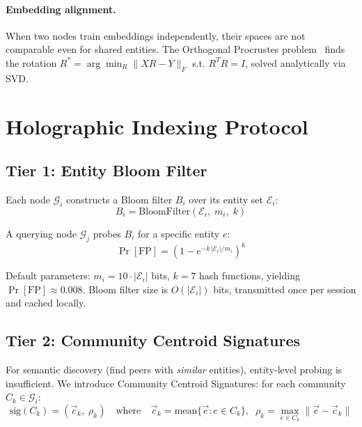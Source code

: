 \documentclass[10pt,twocolumn]{article}
\begin{document}
\paragraph{Embedding alignment.}
When two nodes train embeddings independently, their spaces are not comparable even for
shared entities. The Orthogonal Procrustes problem~\cite{schonemann1966procrustes} finds the
rotation $R^* = \arg\min_R \|XR - Y\|_F$ s.t. $R^TR = I$, solved analytically via SVD.

\section{Holographic Indexing Protocol}
\label{sec:protocol}

\subsection{Tier 1: Entity Bloom Filter}

Each node $\mathcal{G}_i$ constructs a Bloom filter $B_i$ over its entity set $\mathcal{E}_i$:
\begin{equation}
B_i = \mathrm{BloomFilter}(\mathcal{E}_i,\; m_i,\; k)
\label{eq:bloom}
\end{equation}

A querying node $\mathcal{G}_j$ probes $B_i$ for a specific entity $e$:
\begin{equation}
\Pr[\mathrm{FP}] = \left(1 - e^{-k\,|\mathcal{E}_i|/m_i}\right)^k
\label{eq:fpr}
\end{equation}

Default parameters: $m_i = 10 \cdot |\mathcal{E}_i|$ bits, $k = 7$ hash functions, yielding
$\Pr[\mathrm{FP}] \approx 0.008$. Bloom filter size is $O(|\mathcal{E}_i|)$ bits,
transmitted once per session and cached locally.

\subsection{Tier 2: Community Centroid Signatures}

For semantic discovery (find peers with \emph{similar} entities), entity-level probing
is insufficient. We introduce Community Centroid Signatures: for each community
$C_k \in \mathcal{G}_i$:
\begin{equation}
\text{sig}(C_k) = (\vec{c}_k,\; \rho_k) \quad\text{where}\quad
\vec{c}_k = \mathrm{mean}\{\vec{e} : e \in C_k\},\;\;
\rho_k = \max_{e \in C_k} \|\vec{e} - \vec{c}_k\|
\label{eq:signature}
\end{equation}
\end{document}

